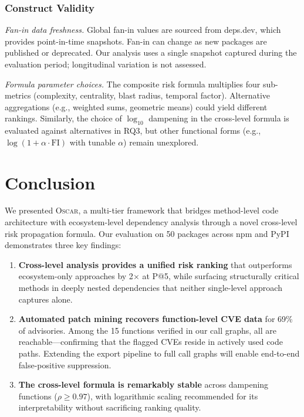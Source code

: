 \documentclass[conference]{IEEEtran}
\begin{document}
\subsubsection{Construct Validity}

\emph{Fan-in data freshness.} Global fan-in values are sourced from deps.dev, which provides point-in-time snapshots. Fan-in can change as new packages are published or deprecated. Our analysis uses a single snapshot captured during the evaluation period; longitudinal variation is not assessed.

\emph{Formula parameter choices.} The composite risk formula multiplies four sub-metrics (complexity, centrality, blast radius, temporal factor). Alternative aggregations (e.g., weighted sums, geometric means) could yield different rankings. Similarly, the choice of $\log_{10}$ dampening in the cross-level formula is evaluated against alternatives in RQ3, but other functional forms (e.g., $\log(1 + \alpha \cdot \mathrm{FI})$ with tunable $\alpha$) remain unexplored.

\section{Conclusion}
\label{sec:conclusion}

We presented \textsc{Oscar}, a multi-tier framework that bridges method-level code architecture with ecosystem-level dependency analysis through a novel cross-level risk propagation formula. Our evaluation on 50 packages across npm and PyPI demonstrates three key findings:

\begin{enumerate}
    \item \textbf{Cross-level analysis provides a unified risk ranking} that outperforms ecosystem-only approaches by 2$\times$ at P@5, while surfacing structurally critical methods in deeply nested dependencies that neither single-level approach captures alone.
    \item \textbf{Automated patch mining recovers function-level CVE data} for 69\% of advisories. Among the 15 functions verified in our call graphs, all are reachable---confirming that the flagged CVEs reside in actively used code paths. Extending the export pipeline to full call graphs will enable end-to-end false-positive suppression.
    \item \textbf{The cross-level formula is remarkably stable} across dampening functions ($\rho \geq 0.97$), with logarithmic scaling recommended for its interpretability without sacrificing ranking quality.
\end{enumerate}
\end{document}
